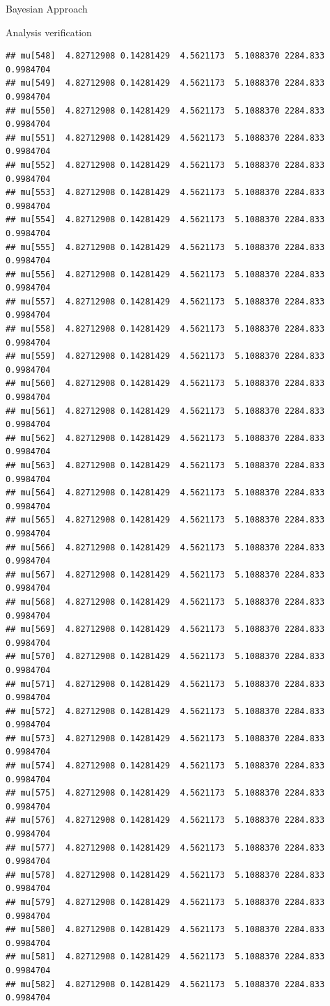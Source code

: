\documentclass[
  ignorenonframetext,
]{beamer}
\begin{document}
\begin{frame}[fragile]{Bayesian Approach}
\begin{block}{Analysis verification}
\begin{verbatim}
## mu[548]  4.82712908 0.14281429  4.5621173  5.1088370 2284.833 0.9984704
## mu[549]  4.82712908 0.14281429  4.5621173  5.1088370 2284.833 0.9984704
## mu[550]  4.82712908 0.14281429  4.5621173  5.1088370 2284.833 0.9984704
## mu[551]  4.82712908 0.14281429  4.5621173  5.1088370 2284.833 0.9984704
## mu[552]  4.82712908 0.14281429  4.5621173  5.1088370 2284.833 0.9984704
## mu[553]  4.82712908 0.14281429  4.5621173  5.1088370 2284.833 0.9984704
## mu[554]  4.82712908 0.14281429  4.5621173  5.1088370 2284.833 0.9984704
## mu[555]  4.82712908 0.14281429  4.5621173  5.1088370 2284.833 0.9984704
## mu[556]  4.82712908 0.14281429  4.5621173  5.1088370 2284.833 0.9984704
## mu[557]  4.82712908 0.14281429  4.5621173  5.1088370 2284.833 0.9984704
## mu[558]  4.82712908 0.14281429  4.5621173  5.1088370 2284.833 0.9984704
## mu[559]  4.82712908 0.14281429  4.5621173  5.1088370 2284.833 0.9984704
## mu[560]  4.82712908 0.14281429  4.5621173  5.1088370 2284.833 0.9984704
## mu[561]  4.82712908 0.14281429  4.5621173  5.1088370 2284.833 0.9984704
## mu[562]  4.82712908 0.14281429  4.5621173  5.1088370 2284.833 0.9984704
## mu[563]  4.82712908 0.14281429  4.5621173  5.1088370 2284.833 0.9984704
## mu[564]  4.82712908 0.14281429  4.5621173  5.1088370 2284.833 0.9984704
## mu[565]  4.82712908 0.14281429  4.5621173  5.1088370 2284.833 0.9984704
## mu[566]  4.82712908 0.14281429  4.5621173  5.1088370 2284.833 0.9984704
## mu[567]  4.82712908 0.14281429  4.5621173  5.1088370 2284.833 0.9984704
## mu[568]  4.82712908 0.14281429  4.5621173  5.1088370 2284.833 0.9984704
## mu[569]  4.82712908 0.14281429  4.5621173  5.1088370 2284.833 0.9984704
## mu[570]  4.82712908 0.14281429  4.5621173  5.1088370 2284.833 0.9984704
## mu[571]  4.82712908 0.14281429  4.5621173  5.1088370 2284.833 0.9984704
## mu[572]  4.82712908 0.14281429  4.5621173  5.1088370 2284.833 0.9984704
## mu[573]  4.82712908 0.14281429  4.5621173  5.1088370 2284.833 0.9984704
## mu[574]  4.82712908 0.14281429  4.5621173  5.1088370 2284.833 0.9984704
## mu[575]  4.82712908 0.14281429  4.5621173  5.1088370 2284.833 0.9984704
## mu[576]  4.82712908 0.14281429  4.5621173  5.1088370 2284.833 0.9984704
## mu[577]  4.82712908 0.14281429  4.5621173  5.1088370 2284.833 0.9984704
## mu[578]  4.82712908 0.14281429  4.5621173  5.1088370 2284.833 0.9984704
## mu[579]  4.82712908 0.14281429  4.5621173  5.1088370 2284.833 0.9984704
## mu[580]  4.82712908 0.14281429  4.5621173  5.1088370 2284.833 0.9984704
## mu[581]  4.82712908 0.14281429  4.5621173  5.1088370 2284.833 0.9984704
## mu[582]  4.82712908 0.14281429  4.5621173  5.1088370 2284.833 0.9984704

\end{verbatim}
\end{block}
\end{frame}
\end{document}

